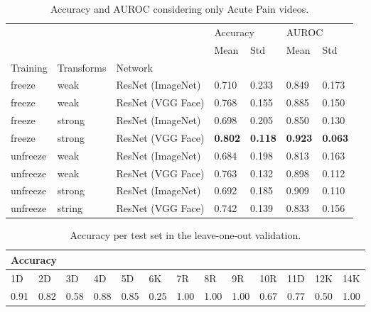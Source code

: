\begin{table}[h!tp]
\centering
\caption{Accuracy and AUROC considering only Acute Pain videos.}
\label{tab:accuracy_auroc_ap}
\begin{tabular}{lllllll}
\toprule
         &        &          & \multicolumn{2}{l}{Accuracy} & \multicolumn{2}{l}{AUROC} \\
         &        &          &      Mean &       Std &      Mean &       Std \\
Training & Transforms & Network &           &           &           &           \\
\midrule
freeze   & weak   & ResNet (ImageNet) &  0.710 &  0.233 &  0.849 &  0.173 \\
freeze   & weak   & ResNet (VGG Face) &  0.768 &  0.155 &  0.885 &  0.150 \\
freeze   & strong & ResNet (ImageNet) &  0.698 &  0.205 &  0.850 &  0.130 \\
freeze   & strong & ResNet (VGG Face) &  \textbf{0.802} & \textbf{ 0.118} &  \textbf{0.923} &  \textbf{0.063} \\
unfreeze & weak   & ResNet (ImageNet) &  0.684 &  0.198 &  0.813 &  0.163 \\
unfreeze & weak   & ResNet (VGG Face) &  0.763 &  0.132 &  0.898 &  0.112 \\
unfreeze & strong & ResNet (ImageNet) &  0.692 &  0.185 &  0.909 &  0.110 \\
unfreeze & string & ResNet (VGG Face) &  0.742 &  0.139 &  0.833 &  0.156 \\
\bottomrule
\end{tabular}
\end{table}

\begin{table}[h!tp]
\centering
\caption{Accuracy per test set in the leave-one-out validation.}
\label{tab:accuracy_leave_one_out}
\begin{tabular}{lllllllllllll}
\hline
\multicolumn{13}{l}{Accuracy}                                                                                                                                                                                                                                                                                                                        \\ \hline
\multicolumn{1}{l|}{1D}   & \multicolumn{1}{l|}{2D}   & \multicolumn{1}{l|}{3D}   & \multicolumn{1}{l|}{4D}   & \multicolumn{1}{l|}{5D}   & \multicolumn{1}{l|}{6K}   & \multicolumn{1}{l|}{7R}   & \multicolumn{1}{l|}{8R}   & \multicolumn{1}{l|}{9R}   & \multicolumn{1}{l|}{10R}  & \multicolumn{1}{l|}{11D}  & \multicolumn{1}{l|}{12K}  & 14K  \\ \hline
\multicolumn{1}{l|}{0.91} & \multicolumn{1}{l|}{0.82} & \multicolumn{1}{l|}{0.58} & \multicolumn{1}{l|}{0.88} & \multicolumn{1}{l|}{0.85} & \multicolumn{1}{l|}{0.25} & \multicolumn{1}{l|}{1.00} & \multicolumn{1}{l|}{1.00} & \multicolumn{1}{l|}{1.00} & \multicolumn{1}{l|}{0.67} & \multicolumn{1}{l|}{0.77} & \multicolumn{1}{l|}{0.50} & 1.00 \\ \hline
\end{tabular}
\end{table}

